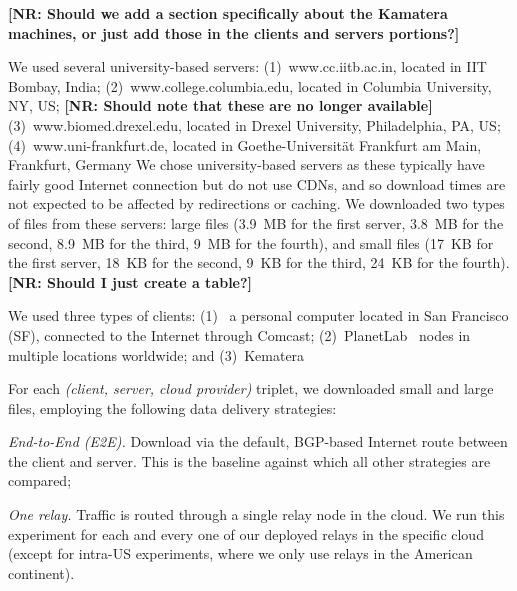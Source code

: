 \documentclass[sigconf,usenames,dvipsnames,geometry]{acmart}
\newcommand{\mycomm}[3]{{\color{#2} \textbf{[#1: #3]}}}
\newcommand{\mycomm}[3]{}
\newcommand{\IK}[1]{\mycomm{IK}{blue}{#1}}
\newcommand{\AB}[1]{\mycomm{AB}{Orange}{#1}}
\newcommand{\NR}[1]{\mycomm{NR}{OliveGreen}{#1}}
\def\compactify{\itemsep=0pt \topsep=0pt \partopsep=0pt \parsep=0pt}
\let\latexusecounter=\usecounter
\newenvironment{CompactEnumerate}
    {\def\usecounter{\compactify\latexusecounter}
     \begin{enumerate}}
    {\end{enumerate}\let\usecounter=\latexusecounter}
\newcommand{\PST}[1]{\smallskip\noindent\textit{#1}} %
\begin{document}
\NR{Should we add a section specifically about the Kamatera machines, or just add those in the clients and servers portions?}

\smallskip{} We used several university-based servers: 
(1)~www.cc.iitb.ac.in, located in IIT Bombay, India; (2)~www.college.columbia.edu, located in Columbia University, NY, US;
\NR{Should note that these are no longer available}
(3)~www.biomed.drexel.edu, located in Drexel University, Philadelphia, PA, US;
(4)~www.uni-frankfurt.de, located in Goethe-Universität Frankfurt am Main, Frankfurt, Germany
We chose university-based servers as these typically have fairly good Internet connection but do not use CDNs, and so download times are not expected to be affected by redirections or caching. We downloaded two types of files from these servers: large files (3.9~MB for the first server, 3.8~MB for the second, 8.9~MB for the third, 9~MB for the fourth), and small files (17~KB for the first server, 18~KB for the second, 9~KB for the third, 24~KB for the fourth).
\NR{Should I just create a table?}

\smallskip{} We used three types of clients: (1)~ a personal computer located in San Francisco (SF), connected to the Internet through Comcast; (2)~PlanetLab~\cite{PlanetLab} nodes in multiple locations worldwide; and (3)~Kematera~\cite{x}

\smallskip{} For each \textit{(client, server, cloud provider)} triplet, we downloaded small and large files, employing the following data delivery strategies:

\PST{End-to-End (E2E).} Download via the default, BGP-based Internet route between the client and server. This is the baseline against which all other strategies are compared;

\PST{One relay.} Traffic is routed through a single relay node in the cloud. We run this experiment for each and every one of our deployed relays in the specific cloud (except for intra-US experiments, where we only use relays in the American continent).
\end{document}
